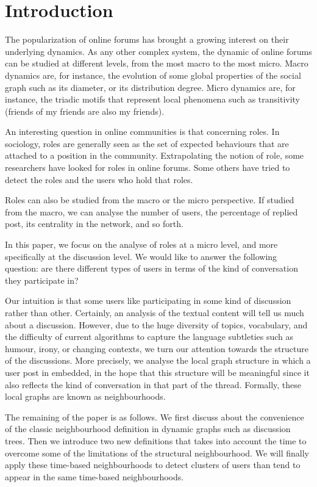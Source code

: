 \documentclass[conference]{IEEEtran}
\begin{document}
\section{Introduction}
The popularization of online forums has brought a growing interest on their underlying dynamics. As any other complex system, the dynamic of online forums can be studied at different levels, from the most macro to the most micro. Macro dynamics are, for instance, the evolution of some global properties of the social graph such as its diameter, or its distribution degree. Micro dynamics are, for instance, the triadic motifs that represent local phenomena such as transitivity (friends of my friends are also my friends).

An interesting question in online communities is that concerning roles. In sociology, roles are generally seen as the set of expected behaviours that are attached  to a position in the community. Extrapolating the notion of role, some researchers have looked for roles in online forums. Some others have tried to detect the roles and the users who hold that roles.

Roles can also be studied from the macro or the micro perspective. If studied from the macro, we can analyse the number of users, the percentage of replied post, its centrality in the network, and  so forth.

In this paper, we focus on the analyse of roles at a micro level, and more specifically at the discussion level. We would like to answer the following question: are there different types of users in terms of the kind of conversation they participate in?


Our intuition is that some users like participating in some kind of discussion rather than other. Certainly, an analysis of the textual content will tell us much about a discussion. However, due to the huge diversity of topics, vocabulary, and the difficulty of current algorithms to capture the language subtleties such as humour, irony, or changing contexts, we turn our attention towards the structure of the discussions. More precisely, we analyse the local graph structure in which a user post in embedded, in the hope that this structure will be meaningful since it also reflects the kind of conversation in that part of the thread. Formally, these local graphs are known as neighbourhoods.


The remaining of the paper is as follows. We first discuss about the convenience of the classic neighbourhood definition in dynamic graphs such as discussion trees. Then we introduce two new definitions that takes into account the time to overcome some of the limitations of the structural neighbourhood. We will finally apply these time-based neighbourhoods to detect clusters of users than tend to appear in the same time-based neighbourhoods.
\end{document}
